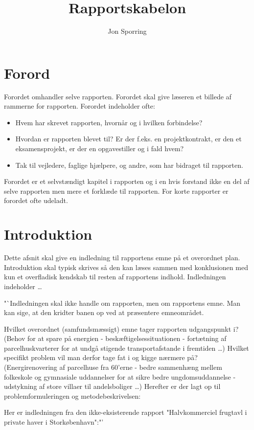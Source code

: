 \documentclass[a4paper]{report}
\title{Rapportskabelon}
\author{Jon Sporring }
\begin{document}
\maketitle

\section{Forord}
Forordet omhandler selve rapporten. Forordet skal give læseren et billede af rammerne for
rapporten. Forordet indeholder ofte:
\begin{itemize}
\item Hvem har skrevet rapporten, hvornår og i hvilken forbindelse?
\item Hvordan er rapporten blevet til? Er der f.eks. en
  projektkontrakt, er den et eksamensprojekt, er der en opgavestiller
  og i fald hvem?
\item Tak til vejledere, faglige hjælpere, og andre, som har bidraget
  til rapporten.
\end{itemize}
Forordet er et selvstændigt kapitel i rapporten og i en hvis forstand
ikke en del af selve rapporten men mere et forklæde til rapporten. For
korte rapporter er forordet ofte udeladt.

\section{Introduktion}
Dette afsnit skal give en indledning til rapportens emne på et
overordnet plan. Introduktion skal typisk skrives så den kan læses
sammen med konklusionen med kun et overfladisk kendskab til resten af
rapportens indhold. Indledningen indeholder  \dots

"`Indledningen skal ikke handle om rapporten, men om rapportens emne. Man kan sige, at den kridter banen op ved at præsentere emneområdet.

Hvilket overordnet (samfundsmæssigt) emne tager rapporten udgangspunkt i? (Behov for at spare på energien - beskæftigelsessituationen - fortætning af parcelhuskvarterer for at undgå stigende transportafstande i fremtiden …)
Hvilket specifikt problem vil man derfor tage fat i og kigge nærmere på? (Energirenovering af parcelhuse fra 60'erne - bedre sammenhæng mellem folkeskole og gymnasiale uddannelser for at sikre bedre ungdomsuddannelse - udstykning af store villaer til andelsboliger …)
Herefter er der lagt op til problemformuleringen og metodebeskrivelsen:


Her er indledningen fra den ikke-eksisterende rapport "Halvkommerciel frugtavl i private haver i Storkøbenhavn":"'
\end{document}
